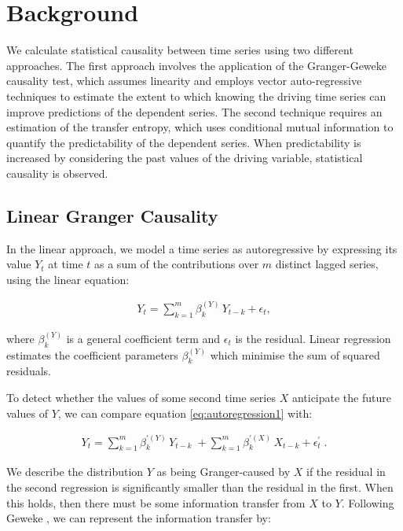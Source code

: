 \documentclass[]{rsos}%
\begin{document}
\section{Background} \label{s.background}  

  We calculate statistical causality between time series using two different approaches. The first approach involves the application of the Granger-Geweke causality test, which assumes linearity and employs vector auto-regressive techniques to estimate the extent to which knowing the driving time series can improve predictions of the dependent series. The second technique requires an estimation of the transfer entropy, which uses conditional mutual information to quantify the predictability of the dependent series. When predictability is increased by considering the past values of the driving variable, statistical causality is observed.
  
  \subsection{Linear {\color{blue}Granger} Causality}
  
  In the linear approach, we model a time series as autoregressive by expressing its value $Y_t$ at time $t$ as a sum of the contributions over $m$ distinct lagged series, using the linear equation:

  \begin{eqnarray}
    \label{eq:autoregression1}
    Y_t = \sum_{k=1}^m \beta_{k}^{(Y)} \, Y_{t-k} + \epsilon_t ,
  \end{eqnarray}

  where $\beta^{(Y)}_k$ is a general coefficient term and $\epsilon_t$ is the residual. Linear regression estimates the coefficient parameters $\beta^{(Y)}_k$ which minimise the sum of squared residuals. 

  To detect whether the values of some second time series $X$ anticipate the future values of $Y$, we can compare equation \ref{eq:autoregression1}  with: 

  \begin{eqnarray}
    \label{eq:autoregression2}
  Y_t = \sum_{k=1}^m \beta_{k}^{\prime(Y)} \, Y_{t-k}  \; + 
        \sum_{k=1}^m \beta_{k}^{\prime(X)} \, X_{t-k} 
  + \epsilon^{\prime}_t \;.
  \end{eqnarray}

We describe the distribution $Y$ as being Granger-caused by $X$ if the residual in the second regression is significantly smaller than the residual in the first. When this holds, then there must be some information transfer from $X$ to $Y$. Following Geweke \cite{geweke1984measures}, we can represent the information transfer by:
\end{document}
